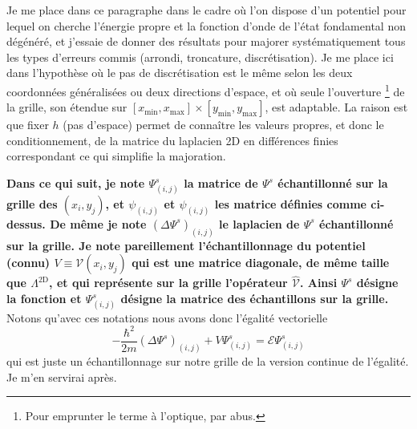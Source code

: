 \documentclass[svgnames,dvipsnames,a4paper,10pt,french]{report}
\begin{document}
\begin{appendices}
Je me place dans ce paragraphe dans le cadre où l'on dispose d'un potentiel pour lequel on cherche l'énergie propre et la fonction d'onde de l'état fondamental  non dégénéré, et j'essaie de donner des résultats pour majorer systématiquement tous les types d'erreurs commis (arrondi, troncature, discrétisation). Je me place ici dans l'hypothèse où le pas de discrétisation est le même selon les deux coordonnées généralisées ou deux directions d'espace, et  où seule l'\og ouverture \fg{}\footnote{Pour emprunter le terme à l'optique, par abus.} de la grille, son étendue sur $[x_\text{min},x_\text{max}] \times [y_\text{min},y_\text{max}]$, est adaptable. La raison est que fixer $h$ (pas d'espace) permet de connaître les valeurs propres, et donc le conditionnement, de la matrice du laplacien 2D en différences finies correspondant ce qui simplifie la majoration.

    





\textbf{Dans ce qui suit, je note $\Psi^s_{(i,j)}$ la matrice de $\Psi^s$ échantillonné sur la grille des $(x_i,y_j)$, et $\psi_{(i,j)}$ et $\psi_{(i,j)}$ les matrice définies comme ci-dessus. De même je note $(\Delta\Psi^s)_{(i,j)}$ le laplacien de $\Psi^s$ échantillonné sur la grille. Je note pareillement l'échantillonnage du potentiel (connu) $V \equiv \mathcal{V}(x_i,y_j)$ qui est une matrice diagonale, de même taille que $\Lambda^\text{2D}$, et qui représente sur la grille l'opérateur $\hat{\mathcal{V}}$. Ainsi $\Psi^s$ désigne la fonction et $\Psi^s_{(i,j)}$ désigne la matrice des échantillons sur la grille.} Notons qu'avec ces notations nous avons donc l'égalité vectorielle
\begin{equation}
\label{egalite_vectorielle_hamiltonien_discret_exact}
    -\frac{\hbar^2}{2m}(\Delta\Psi^s)_{(i,j)} + V\Psi^s_{(i,j)} = \mathcal{E}\Psi^s_{(i,j)}
\end{equation}
qui est juste un échantillonnage sur notre grille de la version continue de l'égalité. Je m'en servirai après.



\end{appendices}
\end{document}
